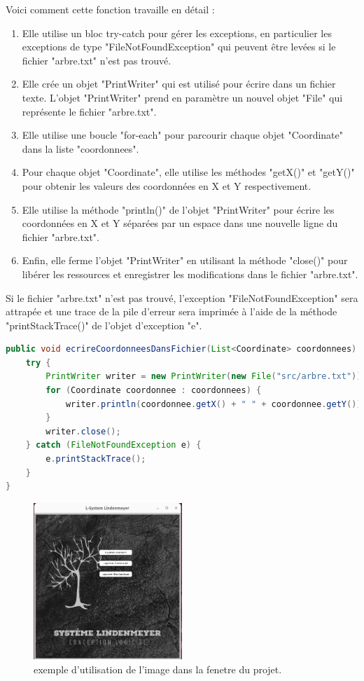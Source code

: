 Voici comment cette fonction travaille en détail :
\begin{enumerate}
    \item  Elle utilise un bloc try-catch pour gérer les exceptions, en particulier les exceptions de type "FileNotFoundException" qui peuvent être levées si le fichier "arbre.txt" n'est pas trouvé.
    \item Elle crée un objet "PrintWriter" qui est utilisé pour écrire dans un fichier texte. L'objet "PrintWriter" prend en paramètre un nouvel objet "File" qui représente le fichier "arbre.txt".
    \item Elle utilise une boucle "for-each" pour parcourir chaque objet "Coordinate" dans la liste "coordonnees".
    \item Pour chaque objet "Coordinate", elle utilise les méthodes "getX()" et "getY()" pour obtenir les valeurs des coordonnées en X et Y respectivement.
    \item Elle utilise la méthode "println()" de l'objet "PrintWriter" pour écrire les coordonnées en X et Y séparées par un espace dans une nouvelle ligne du fichier "arbre.txt".
    \item   Enfin, elle ferme l'objet "PrintWriter" en utilisant la méthode "close()" pour libérer les ressources et enregistrer les modifications dans le fichier "arbre.txt".

\end{enumerate}
   Si le fichier "arbre.txt" n'est pas trouvé, l'exception "FileNotFoundException" sera attrapée et une trace de la pile d'erreur sera imprimée à l'aide de la méthode "printStackTrace()" de l'objet d'exception "e".

\newpage
\label{code}
\begin{lstlisting}[language=Java, frame=single]
public void ecrireCoordonneesDansFichier(List<Coordinate> coordonnees) {
    try {
        PrintWriter writer = new PrintWriter(new File("src/arbre.txt"));
        for (Coordinate coordonnee : coordonnees) {
            writer.println(coordonnee.getX() + " " + coordonnee.getY());
        }
        writer.close();
    } catch (FileNotFoundException e) {
        e.printStackTrace();
    }
}
\end{lstlisting}
\begin{figure}[h!]
  \centering
  \includegraphics[width=0.5\textwidth]{images/fenetre.png}
  \caption{exemple d'utilisation de l'image dans la fenetre du projet.}
  \label{fig:org}
\end{figure}
\newpage

